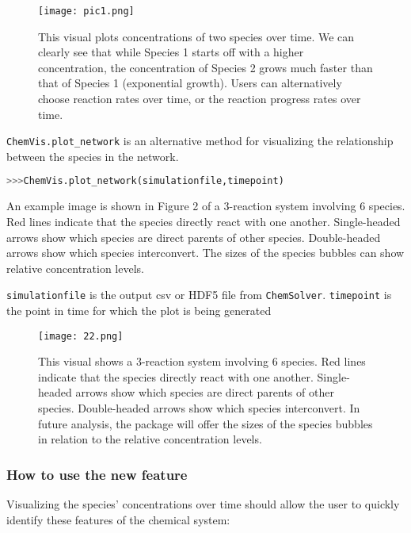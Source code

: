 \documentclass[12pt]{article}
\begin{document}
\begin{figure}[h!]
  \caption{This visual plots concentrations of two species over time. We can clearly see that while Species 1 starts off with a higher concentration, the concentration of Species 2 grows much faster than that of Species 1 (exponential growth). Users can alternatively choose reaction rates over time, or the reaction progress rates over time. }
  \centering
  \texttt{[image: pic1.png]}
\end{figure}



\texttt{ChemVis.plot\_network} is an alternative method for visualizing the relationship between the species in the network. 

\begin{lstlisting}[language = Python, basicstyle = \ttfamily, breaklines = True, columns = fullflexible]
>>>ChemVis.plot_network(simulationfile,timepoint)
\end{lstlisting}
An example image is shown in Figure 2 of a 3-reaction system involving 6 species. Red lines indicate that the species directly react with one another. Single-headed arrows show which species are direct parents of other species. Double-headed arrows show which species interconvert. The sizes of the species bubbles can show relative concentration levels. 

\texttt{simulationfile} is the output csv or HDF5 file from \texttt{ChemSolver}. \texttt{timepoint} is the point in time for which the plot is being generated



\begin{figure}[h!]
  \caption{This visual shows a 3-reaction system involving 6 species. Red lines indicate that the species directly react with one another. Single-headed arrows show which species are direct parents of other species. Double-headed arrows show which species interconvert. In future analysis, the package will offer the sizes of the species bubbles in relation to the relative concentration levels. }
  \centering
  \texttt{[image: 22.png]}
\end{figure}

\newpage


\subsubsection{How to use the new feature}
Visualizing the species’ concentrations over time should allow the user to quickly identify these features of the chemical system:
\end{document}
